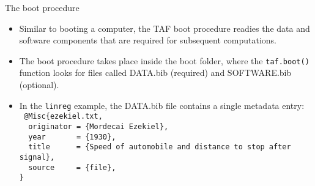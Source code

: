 \documentclass[aspectratio=169]{beamer}
\begin{document}
\begin{frame}{The boot procedure}\small
  \begin{itemize}
    \item[] Similar to booting a computer, the TAF boot procedure readies the
    data and\\[0.2ex]
    software components that are required for subsequent computations.\\[4ex]
    \item[] The boot procedure takes place inside the boot folder, where the
    {\tt\blue taf.boot()}\\[0.2ex]
    function looks for files called {\darkgreen DATA.bib} (required) and
    {\darkgreen SOFTWARE.bib} (optional).\\[4ex]
    \item[] In the {\tt linreg} example, the DATA.bib file contains a single
    metadata entry:\\[2ex]\tt\fns
    {\darkgray @Misc}\{ezekiel.txt,\\
    ~ {\green originator} = \{Mordecai Ezekiel\},\\
    ~ {\green year} ~~~~~ = \{1930\},\\
    ~ {\green title} ~~~~ = \{Speed of automobile and distance to stop after
    signal\},\\
    ~ {\green source} ~~~ = \{file\},\\
    \}\\[5ex]
  \end{itemize}
\end{frame}

\end{document}
